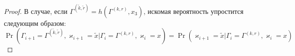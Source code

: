 \documentclass[a4paper,12pt,russian]{extarticle}
\newcommand{\ga}[1]{\Gamma^{\left( #1 \right)} }
\begin{document}
\begin{proof}
В случае, если $\ga{\tilde{k},\tilde{r}}=h(\ga{k,r},x_3)$, искомая вероятность упростится следующим образом:
\begin{equation*}
\Pr (\Gamma_{i+1}=\ga{\tilde{k},\tilde{r}},\varkappa_{i+1}=\tilde{x}|\Gamma_{i}=\ga{k,r},\varkappa_i=x) 
=\Pr (\varkappa_{i+1}=\tilde{x}|\Gamma_{i}=\ga{k,r},\varkappa_i=x) 
\end{equation*}


\end{proof}
\end{document}
